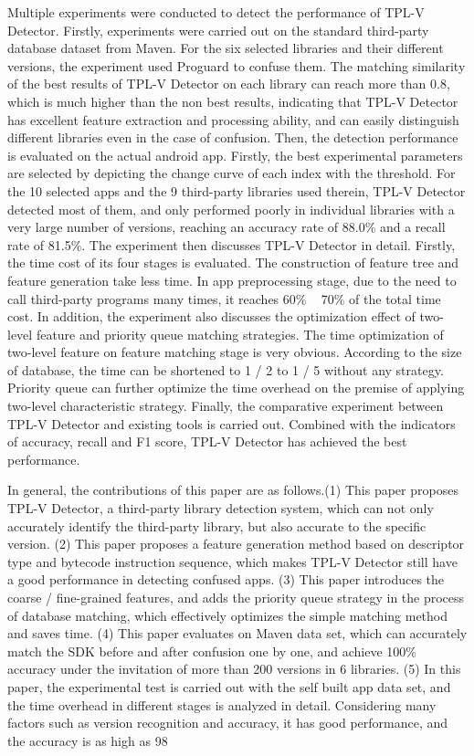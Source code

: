 \begin{digest}
Multiple experiments were conducted to detect the performance of TPL-V Detector. Firstly, experiments were carried out on the standard third-party database dataset from Maven. For the six selected libraries and their different versions, the experiment used Proguard to confuse them. The matching similarity of the best results of TPL-V Detector on each library can reach more than 0.8, which is much higher than the non best results, indicating that TPL-V Detector has excellent feature extraction and processing ability, and can easily distinguish different libraries even in the case of confusion. Then, the detection performance is evaluated on the actual android app. Firstly, the best experimental parameters are selected by depicting the change curve of each index with the threshold. For the 10 selected apps and the 9 third-party libraries used therein, TPL-V Detector detected most of them, and only performed poorly in individual libraries with a very large number of versions, reaching an accuracy rate of 88.0\% and a recall rate of 81.5\%. The experiment then discusses TPL-V Detector in detail. Firstly, the time cost of its four stages is evaluated. The construction of feature tree and feature generation take less time. In app preprocessing stage, due to the need to call third-party programs many times, it reaches 60\% ~ 70\% of the total time cost. In addition, the experiment also discusses the optimization effect of two-level feature and priority queue matching strategies. The time optimization of two-level feature on feature matching stage is very obvious. According to the size of database, the time can be shortened to 1 / 2 to 1 / 5 without any strategy. Priority queue can further optimize the time overhead on the premise of applying two-level characteristic strategy. Finally, the comparative experiment between TPL-V Detector and existing tools is carried out. Combined with the indicators of accuracy, recall and F1 score, TPL-V Detector has achieved the best performance.



In general, the contributions of this paper are as follows.(1) This paper proposes TPL-V Detector, a third-party library detection system, which can not only accurately identify the third-party library, but also accurate to the specific version. (2) This paper proposes a feature generation method based on descriptor type and bytecode instruction sequence, which makes TPL-V Detector still have a good performance in detecting confused apps. (3) This paper introduces the coarse / fine-grained features, and adds the priority queue strategy in the process of database matching, which effectively optimizes the simple matching method and saves time. (4) This paper evaluates on Maven data set, which can accurately match the SDK before and after confusion one by one, and achieve 100\% accuracy under the invitation of more than 200 versions in 6 libraries. (5) In this paper, the experimental test is carried out with the self built app data set, and the time overhead in different stages is analyzed in detail. Considering many factors such as version recognition and accuracy, it has good performance, and the accuracy is as high as 98%




\end{digest}
